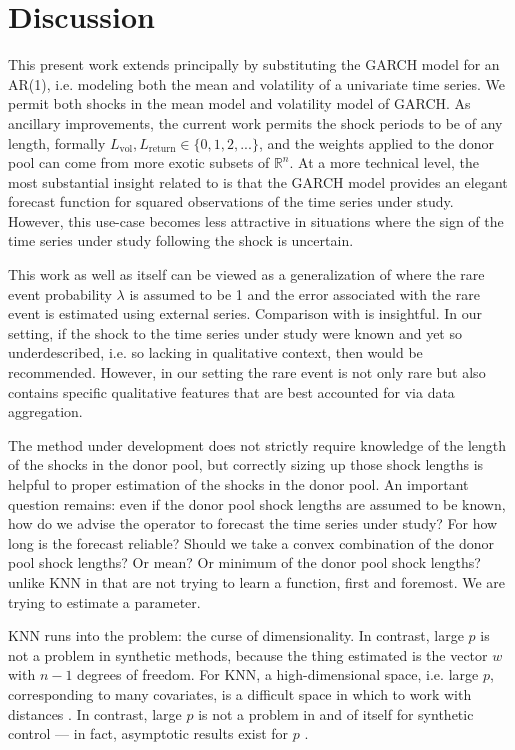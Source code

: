 \documentclass[11pt,3p,review,authoryear]{elsarticle}
\theoremstyle{definition}
\begin{document}
\section{Discussion}

This present work extends \citet{lin2021minimizing} principally by substituting the GARCH model for an AR(1), i.e. modeling both the mean and volatility of a univariate time series.  We permit both shocks in the mean model and volatility model of GARCH.  As ancillary improvements, the current work permits the shock periods to be of any length, formally $L_{\text{vol}}, L_{\text{return}} \in\{0,1,2,...\}$, and the weights applied to the donor pool can come from more exotic subsets of $\mathbb{R}^{n}$.  At a more technical level, the most substantial insight related to \citet{lin2021minimizing} is that the GARCH model provides an elegant forecast function for squared observations of the time series under study. However, this use-case becomes less attractive in situations where the sign of the time series under study following the shock is uncertain.

This work as well as \citet{lin2021minimizing} itself can be viewed as a generalization of \cite{phillips1996forecasting} where the rare event probability $\lambda$ is assumed to be 1 and the error associated with the rare event is estimated using external series.  Comparison with \citet{phillips1996forecasting} is insightful.  In our setting, if the shock to the time series under study were known and yet so underdescribed, i.e. so lacking in qualitative context, then \cite{phillips1996forecasting} would be recommended.  However, in our setting the rare event is not only rare but also contains specific qualitative features that are best accounted for via data aggregation.

The method under development does not strictly require knowledge of the length of the shocks in the donor pool, but correctly sizing up those shock lengths is helpful to proper estimation of the shocks in the donor pool.  An important question remains: even if the donor pool shock lengths are assumed to be known, how do we advise the operator to forecast the time series under study?  For how long is the forecast reliable?  Should we take a convex combination of the donor pool shock lengths?  Or mean? Or minimum of the donor pool shock lengths?
unlike KNN in that are not trying to learn a function, first and foremost.  We are trying to estimate a parameter.

KNN runs into the problem: the curse of dimensionality.  In contrast, large $p$ is not a problem in synthetic methods, because the thing estimated is the vector $w$ with $n-1$ degrees of freedom.  For KNN, a high-dimensional space, i.e. large $p$, corresponding to many covariates, is a difficult space in which to work with distances \citep{hastie2009elements}.  In contrast, large $p$ is not a problem in and of itself for synthetic control --- in fact, asymptotic results exist for $p$ \citep{abadie2010synthetic}.  
\end{document}
